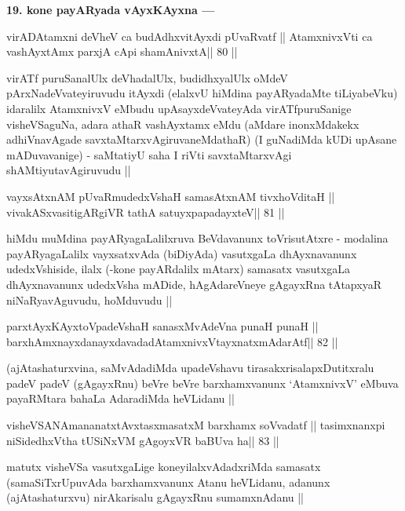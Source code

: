 \begin{artha}
{\bf 19. kone payARyada vAyxKAyxna ---}
\end{artha} 

\begin{shl}
virADAtamxni deVheV ca budAdhxvitAyxdi pUvaRvatf ||
AtamxnivxVti ca vashAyxtAmx parxjA cApi shamAnivxtA\hfill || 80 ||
\end{shl}

\begin{artha}
virATf puruSanalUlx deVhadalUlx, budidhxyalUlx oMdeV pArxNadeVvateyiruvudu itAyxdi (elalxvU hiMdina payARyadaMte tiLiyabeVku) idaralilx AtamxnivxV eMbudu upAsayxdeVvateyAda virATfpuruSanige visheVSaguNa, adara athaR vashAyxtamx eMdu (aMdare inonxMdakekx adhiVnavAgade savxtaMtarxvAgiruvaneMdathaR) (I guNadiMda kUDi upAsane mADuvavanige) - saMtatiyU saha I riVti savxtaMtarxvAgi shAMtiyutavAgiruvudu ||
\end{artha}

\begin{shl}
vayxsAtxnAM pUvaRmudedxVshaH samasAtxnAM tivxhoVditaH ||
vivakASxvasitigARgiVR tathA satuyxpapadayxteV\hfill || 81 ||
\end{shl}

\begin{artha}
hiMdu muMdina payARyagaLalilxruva BeVdavanunx toVrisutAtxre - modalina payARyagaLalilx vayxsatxvAda (biDiyAda) vasutxgaLa dhAyxnavanunx udedxVshiside, ilalx (-kone payARdalilx mAtarx) samasatx vasutxgaLa dhAyxnavanunx udedxVsha mADide, hAgAdareVneye gAgayxRna tAtapxyaR niNaRyavAguvudu, hoMduvudu ||
\end{artha}

\begin{shl}
parxtAyxKAyxtoVpadeVshaH sanasxMvAdeVna punaH punaH ||
barxhAmxnayxdanayxdavadadAtamxnivxVtayxnatxmAdarAtf\hfill || 82 ||
\end{shl}

\begin{artha}
(ajAtashaturxvina, saMvAdadiMda upadeVshavu tirasakxrisalapxDutitxralu padeV padeV (gAgayxRnu) beVre beVre barxhamxvanunx `AtamxnivxV' eMbuva payaRMtara bahaLa AdaradiMda heVLidanu ||
\end{artha}

\begin{shl}
visheVSANAmananatxtAvxtasxmasatxM barxhamx soV\s vadatf ||
tasimxnanxpi niSidedhxV\s tha tUSiNxVM gAgoyxVR baBUva ha\hfill || 83 ||
\end{shl}

\begin{artha}
matutx visheVSa vasutxgaLige koneyilalxvAdadxriMda samasatx (samaSiTxrUpuvAda barxhamxvanunx Atanu heVLidanu, adanunx (ajAtashaturxvu) nirAkarisalu gAgayxRnu sumamxnAdanu ||
\end{artha}

